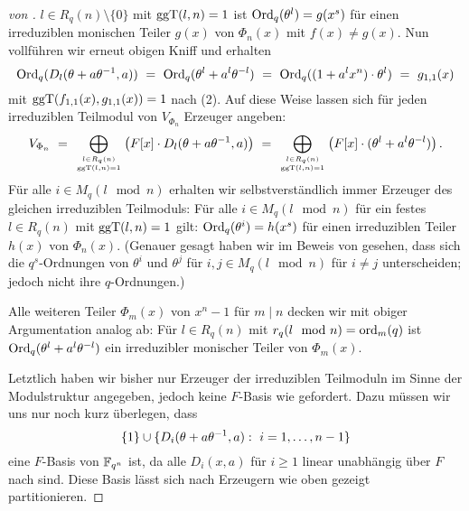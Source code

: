 \begin{proof}[von ]
  $l \in R_q(n)\setminus \{ 0\}$ mit $\operatorname{ggT}(l,n) = 1$ ist
  $\operatorname{Ord}_q(\theta^l) = g(x^s)$ für einen irreduziblen monischen Teiler 
  $g(x)$ von $\Phi_n(x)$ mit $f(x) \neq g(x)$. 
  Nun vollführen wir erneut obigen Kniff und erhalten 
  \[ \operatorname{Ord}_q(D_l(\theta+a\theta^{-1},a)) \ =\ 
    \operatorname{Ord}_q(\theta^l+a^l\theta^{-l}) \ =\  
    \operatorname{Ord}_q( (1+a^lx^n)\cdot \theta^l ) \ =\  g_{1,1}(x)\]
  mit $\operatorname{ggT}(f_{1,1}(x), g_{1,1}(x)) = 1$ nach  (2).
  Auf diese Weise lassen sich für jeden irreduziblen Teilmodul von 
  $V_{\Phi_n}$ Erzeuger angeben:
  \[ V_{\Phi_n} \ =\  \bigoplus_{l\in R_q(n)\atop \operatorname{ggT}(l,n)=1} 
    \big( F[x] \cdot D_l(\theta+a\theta^{-1},a)\big) \ =\ 
    \bigoplus_{l\in R_q(n)\atop \operatorname{ggT}(l,n)=1} 
    \big( F[x]\cdot (\theta^l+a^l\theta^{-l}) \big)\,. \]
  Für alle $i \in M_q(l\mod n)$ erhalten wir 
  selbstverständlich immer Erzeuger des
  gleichen irreduziblen Teilmoduls: Für alle 
  $i\in M_q(l\mod n)$ für ein festes $l\in R_q(n)$ mit 
  $\operatorname{ggT}(l,n)=1$ gilt: $\operatorname{Ord}_q(\theta^i) = h(x^s)$ für einen
  irreduziblen Teiler $h(x)$ von $\Phi_n(x)$. (Genauer gesagt haben wir 
  im Beweis von  gesehen,
  dass sich die $q^s$-Ordnungen von $\theta^i$ und $\theta^j$ für 
  $i,j \in M_q(l\mod n)$ für $i\neq j$ unterscheiden; jedoch nicht ihre
  $q$-Ordnungen.) 

  Alle weiteren Teiler $\Phi_m(x)$ von $x^n-1$ für $m\mid n$ decken wir mit
  obiger Argumentation analog ab: Für $l \in R_q(n)$ mit 
  $r_q(l\mod n) = \operatorname{ord}_m(q)$ ist 
  $\operatorname{Ord}_q(\theta^l+a^l\theta^{-l})$ ein irreduzibler monischer Teiler
  von $\Phi_m(x)$.

  Letztlich haben wir bisher nur Erzeuger der irreduziblen Teilmoduln 
  im Sinne der Modulstruktur angegeben, jedoch keine $F$-Basis wie gefordert.
  Dazu müssen wir uns nur noch kurz überlegen, dass
  \[\{1\}\cup \{ D_i(\theta+a\theta\inv,a):\ i=1,\ldots,n-1\} \]
  eine $F$-Basis von $\mathbb{F}_{q^n}$ ist, da alle $D_i(x,a)$ für
  $i\geq 1$ linear unabhängig über $F$ nach 
   sind. Diese Basis lässt sich nach 
  Erzeugern wie oben gezeigt partitionieren.
\end{proof}



